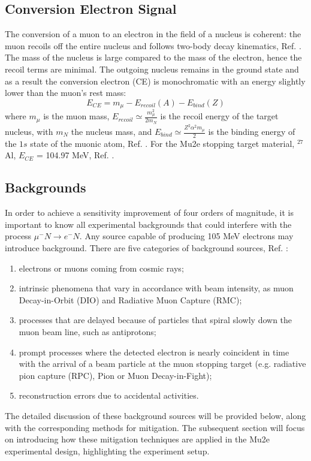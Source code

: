 \subsection{Conversion Electron Signal}
The conversion of a muon to an electron in the field of a nucleus is coherent: 
the muon recoils off the entire nucleus and follows two-body decay kinematics, 
Ref. \cite{bartoszek2015mu2e}. The mass of the nucleus is large compared to the 
mass of the electron, hence the recoil terms are minimal. The outgoing nucleus 
remains in the ground state and as a result the conversion electron (CE) is 
monochromatic with an energy slightly lower than the muon's rest mass:
\begin{equation}
    E_{CE} = m_\mu - E_{recoil}(A) - E_{bind}(Z) 
\end{equation}
where $m_\mu$ is the muon mass, $E_{recoil}\simeq \frac{m^2_\mu}{2 m_N}$ is 
the recoil energy of the target nucleus, with $m_N$ the nucleus mass, and 
$E_{bind}\simeq \frac{Z^2 \alpha^2 m_\mu}{2}$ is the binding energy of the 
$1s$ state of the muonic atom, Ref. \cite{universe9010054}. For the Mu2e 
stopping target material, $^{27}$Al, $E_{CE}$ = 104.97 MeV, Ref. \cite{PhysRevD.84.013006}.
\subsection{Backgrounds}\label{backgrounds}
In order to achieve a sensitivity improvement of four orders of magnitude, 
it is important to know all experimental backgrounds that could interfere with 
the process $\mu^- N \rightarrow e^- N $. Any source capable of producing 105 MeV 
electrons may introduce background. There are five categories of background sources, Ref. \cite{bartoszek2015mu2e}:
\begin{enumerate}
\item electrons or muons coming from cosmic rays;
\item intrinsic phenomena that vary in accordance with beam intensity, as muon Decay-in-Orbit (DIO) and Radiative Muon Capture (RMC);
\item processes that are delayed because of particles that spiral slowly down the muon beam line, such as antiprotons;
\item prompt processes where the detected electron is nearly coincident in time with the arrival of a beam particle at the muon stopping target (e.g. radiative pion capture (RPC), Pion or Muon Decay-in-Fight);
\item reconstruction errors due to accidental activities.
\end{enumerate}
The detailed discussion of these background sources will be provided below, along with the corresponding methods for mitigation. The subsequent section will focus on introducing how these mitigation techniques are applied in the Mu2e experimental design, highlighting the experiment setup.
